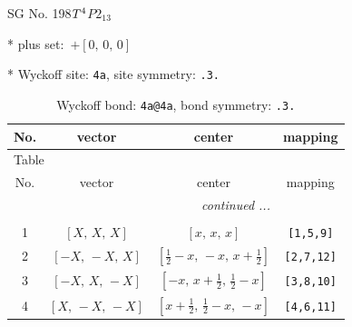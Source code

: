 \documentclass[fleqn,8pt]{jsarticle}
\begin{document}
\setcounter{MaxMatrixCols}{32}

\renewcommand{\tablename}{Table~}
\renewcommand{\figurename}{Figure~}
\begin{center}
\LARGE
SG No. 198\quad$T_{\rm }^{4}$\quad$P2_13$\quad[ cubic ]
\end{center}

* plus set:\,\,\,$+\left[ 0,\, 0,\, 0 \right]$


* Wyckoff site: {\tt 4a}, site symmetry: {\tt .3.}
\renewcommand{\arraystretch}{1.2}
\begin{longtable}{cccc}
\caption{Wyckoff bond: {\tt 4a@4a}, bond symmetry: {\tt .3.}}
 \\
 \hline \hline
No. & vector & center & mapping \\ \hline \endfirsthead

\multicolumn{3}{l}{\tablename\ \thetable{}} \\
 \hline \hline
No. & vector & center & mapping \\ \hline \endhead

 \hline \hline
\multicolumn{3}{r}{\footnotesize\it continued ...} \\ \endfoot

 \hline \hline
\multicolumn{3}{r}{} \\ \endlastfoot

1 & $\left[ X,\, X,\, X \right]$ & $\left[ x,\, x,\, x \right]$ & {\tt [1,5,9]} \\ \hline
2 & $\left[ - X,\, - X,\, X \right]$ & $\left[ \frac{1}{2} - x,\, - x,\, x + \frac{1}{2} \right]$ & {\tt [2,7,12]} \\ \hline
3 & $\left[ - X,\, X,\, - X \right]$ & $\left[ - x,\, x + \frac{1}{2},\, \frac{1}{2} - x \right]$ & {\tt [3,8,10]} \\ \hline
4 & $\left[ X,\, - X,\, - X \right]$ & $\left[ x + \frac{1}{2},\, \frac{1}{2} - x,\, - x \right]$ & {\tt [4,6,11]} \\
\end{longtable}
\renewcommand{\arraystretch}{1.2}
\end{document}
